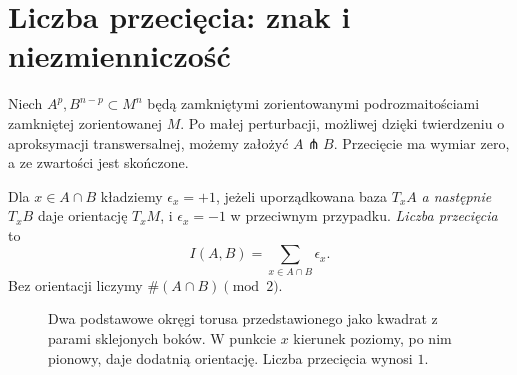 \section{Liczba przecięcia: znak i niezmienniczość}
\label{sec:przeciecia-16}

Niech $A^p,B^{n-p}\subset M^n$ będą
zamkniętymi zorientowanymi
podrozmaitościami zamkniętej
zorientowanej $M$. Po małej
perturbacji, możliwej dzięki twierdzeniu o aproksymacji transwersalnej,
możemy założyć $A\pitchfork B$.
Przecięcie ma wymiar zero,
a ze zwartości jest skończone.

\begin{definicja}
\label{def:liczba-przeciecia-16}
Dla $x\in A\cap B$ kładziemy
$\epsilon_x=+1$, jeżeli
uporządkowana baza
$T_xA$ \emph{a następnie}
$T_xB$ daje orientację $T_xM$,
i $\epsilon_x=-1$ w przeciwnym
przypadku. \emph{Liczba
przecięcia} to
\[
 I(A,B)=\sum_{x\in A\cap B}\epsilon_x.
\]
Bez orientacji liczymy
$\#(A\cap B)\pmod 2$.
\end{definicja}

\begin{figure}[htbp]
\centering
{}
\caption{Dwa podstawowe okręgi torusa
przedstawionego jako kwadrat z parami
sklejonych boków. W punkcie $x$ kierunek
poziomy, po nim pionowy, daje dodatnią
orientację. Liczba przecięcia wynosi $1$.}
\label{fig:przeciecie-torus-16}
\end{figure}

